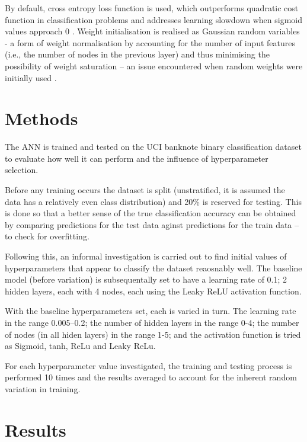 \documentclass{article}
\begin{document}
By default, cross entropy loss function is used, which outperforms
quadratic cost function in classification problems and addresses
learning slowdown when sigmoid values approach 0 \cite{Nielsen}
\cite{Xavier}. Weight initialisation is realised as Gaussian random
variables - a form of weight normalisation by accounting for the number
of input features (i.e., the number of nodes in the previous layer) and
thus minimising the possibility of weight saturation -- an issue
encountered when random weights were initially used \cite{Nielsen}.

\vspace{-1em}
\section{Methods}

The ANN is trained and tested on the UCI banknote binary
classification dataset to evaluate how well it can perform and the
influence of hyperparameter selection.

Before any training occurs the dataset is split (unstratified, it is
assumed the data has a relatively even class distribution) and 20\%
is reserved for testing. This is done so that a better sense of the
true classification accuracy can be obtained by comparing predictions
for the test data aginst predictions for the train data -- to check for
overfitting.

Following this, an informal investigation is carried out to find initial
values of hyperparameters that appear to classify the dataset reaosnably
well. The baseline model (before variation) is subsequentally set to
have a learning rate of 0.1; 2 hidden layers, each with 4 nodes,
each using the Leaky ReLU activation function.

With the baseline hyperparameters set, each is varied in turn. The
learning rate in the range 0.005--0.2; the number of hidden layers in
the range 0-4; the number of nodes (in all hiden layers) in the range
1-5; and the activation function is tried as Sigmoid, tanh, ReLu and
Leaky ReLu.

For each hyperparameter value investigated, the training and testing
process is performed 10 times and the results averaged to account for
the inherent random variation in training.

\section{Results}
\end{document}
